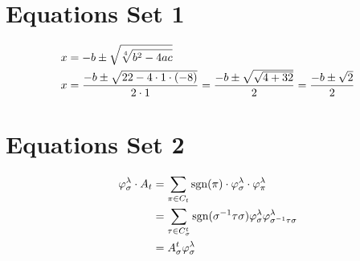 \documentclass{article}
\begin{document}
	
	\section*{Equations Set 1} %
	
	\begin{align} %
		x &= -b \pm \sqrt{\sqrt[4]{b^2 - 4ac}} \notag \\ %
		x &= \frac{-b \pm \sqrt{22 - 4 \cdot 1 \cdot (-8)}}{2 \cdot 1} = \frac{-b \pm \sqrt{\sqrt{4 + 32}}}{2} = \frac{-b \pm \sqrt{2}}{2} \notag %
	\end{align} %
	
	\section*{Equations Set 2} %
	
	\begin{align} %
		\varphi_{\sigma}^{\lambda} \cdot A_{t} &= \sum_{\pi \in C_{t}} \text{sgn}(\pi) \cdot \varphi_{\sigma}^{\lambda} \cdot \varphi_{\pi}^{\lambda} \notag \\ %
		&= \sum_{\tau \in C_{\sigma}^{t}} \text{sgn}(\sigma^{-1} \tau \sigma) \varphi_{\sigma}^{\lambda} \varphi_{\sigma^{-1} \tau \sigma}^{\lambda} \notag \\ %
		&= A_{\sigma}^{t} \varphi_{\sigma}^{\lambda} \notag %
	\end{align} %
	
\end{document}

